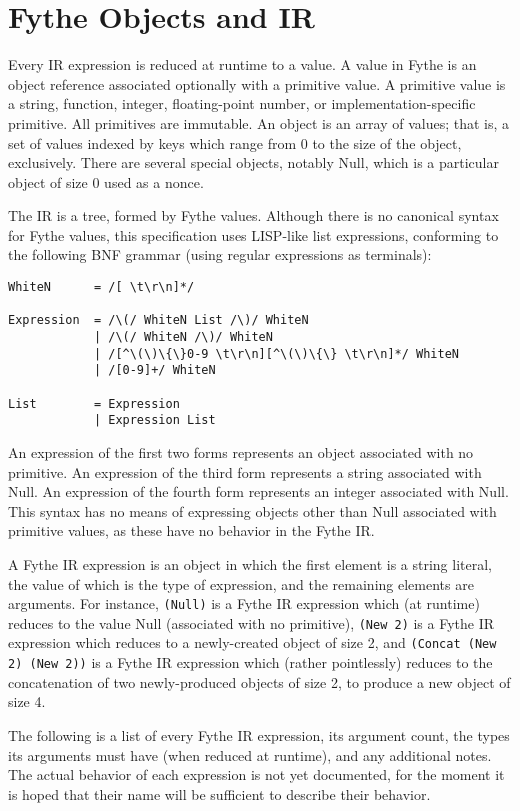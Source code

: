 \chapter{Fythe Objects and IR}

Every IR expression is reduced at runtime to a value. A value in Fythe is an
object reference associated optionally with a primitive value. A primitive
value is a string, function, integer, floating-point number, or
implementation-specific primitive. All primitives are immutable. An object is
an array of values; that is, a set of values indexed by keys which range from 0
to the size of the object, exclusively. There are several special objects,
notably Null, which is a particular object of size 0 used as a nonce.

The IR is a tree, formed by Fythe values. Although there is no canonical syntax
for Fythe values, this specification uses LISP-like list expressions,
conforming to the following BNF grammar (using regular expressions as
terminals):

\begin{verbatim}
WhiteN      = /[ \t\r\n]*/

Expression  = /\(/ WhiteN List /\)/ WhiteN
            | /\(/ WhiteN /\)/ WhiteN
            | /[^\(\)\{\}0-9 \t\r\n][^\(\)\{\} \t\r\n]*/ WhiteN
            | /[0-9]+/ WhiteN

List        = Expression
            | Expression List
\end{verbatim}

An expression of the first two forms represents an object associated with no
primitive. An expression of the third form represents a string associated with
Null. An expression of the fourth form represents an integer associated with
Null. This syntax has no means of expressing objects other than Null associated
with primitive values, as these have no behavior in the Fythe IR.

A Fythe IR expression is an object in which the first element is a string
literal, the value of which is the type of expression, and the remaining
elements are arguments. For instance,
\texttt{(Null)}
is a Fythe IR expression which (at runtime) reduces to the value Null
(associated with no primitive),
\texttt{(New 2)}
is a Fythe IR expression which reduces to a newly-created object of size 2, and
\texttt{(Concat (New 2) (New 2))}
is a Fythe IR expression which (rather pointlessly) reduces to the
concatenation of two newly-produced objects of size 2, to produce a new object
of size 4.

The following is a list of every Fythe IR expression, its argument count, the
types its arguments must have (when reduced at runtime), and any additional
notes. The actual behavior of each expression is not yet documented, for the
moment it is hoped that their name will be sufficient to describe their
behavior.

